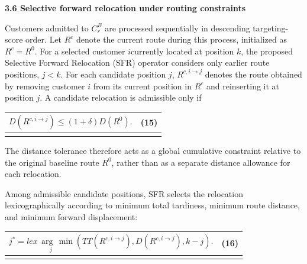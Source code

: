 \documentclass[
]{article}
\newcounter{none} %
\begin{document}
\textbf{3.6 Selective forward relocation under routing constraints}

Customers admitted to \(C_{r}^{B}\) are processed sequentially in
descending targeting-score order. Let \(R^{c}\) denote the current route
during this process, initialized as \(R^{c} = R^{0}\). For a selected
customer \(i\)currently located at position \(k\), the proposed
Selective Forward Relocation (SFR) operator considers only earlier route
positions, \(j < k\). For each candidate position \(j\),
\(R^{c,i \rightarrow j}\) denotes the route obtained by removing
customer \(i\) from its current position in \(R^{c}\) and reinserting it
at position \(j\). A candidate relocation is admissible only if

{\def\LTcaptype{none} %
\begin{longtable}[]{@{}
  >{\raggedright\arraybackslash}p{}
  >{\raggedright\arraybackslash}p{}@{}}
\toprule\noalign{}
\begin{minipage}[b]{\linewidth}\raggedright
\[D\left( R^{c,i \rightarrow j} \right) \leq (1 + \delta)D\left( R^{0} \right).\]
\end{minipage} & \begin{minipage}[b]{\linewidth}\raggedleft
(15)
\end{minipage} \\
\midrule\noalign{}
\endhead
\bottomrule\noalign{}
\endlastfoot
\end{longtable}
}

The distance tolerance therefore acts as a global cumulative constraint
relative to the original baseline route \(R^{0}\), rather than as a
separate distance allowance for each relocation.

Among admissible candidate positions, SFR selects the relocation
lexicographically according to minimum total tardiness, minimum route
distance, and minimum forward displacement:

{\def\LTcaptype{none} %
\begin{longtable}[]{@{}
  >{\raggedright\arraybackslash}p{}
  >{\raggedright\arraybackslash}p{}@{}}
\toprule\noalign{}
\begin{minipage}[b]{\linewidth}\raggedright
\[j^{*} = \underset{j}{lex\,\arg\,\min}(TT\left( R^{c,i \rightarrow j} \right),D\left( R^{c,i \rightarrow j} \right),k - j).\]
\end{minipage} & \begin{minipage}[b]{\linewidth}\raggedleft
(16)
\end{minipage} \\
\midrule\noalign{}
\endhead
\bottomrule\noalign{}
\endlastfoot
\end{longtable}
}
\end{document}
